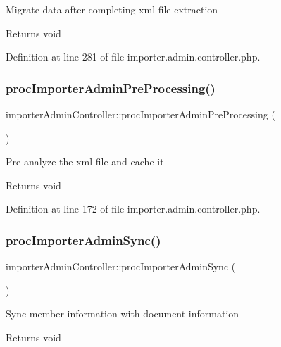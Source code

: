 Migrate data after completing xml file extraction \begin{DoxyReturn}{Returns}
void 
\end{DoxyReturn}


Definition at line 281 of file importer.\+admin.\+controller.\+php.

\hypertarget{classimporterAdminController_a112303ff9925d381a27f526b97909205}{}\label{classimporterAdminController_a112303ff9925d381a27f526b97909205} 
\subsubsection{\texorpdfstring{proc\+Importer\+Admin\+Pre\+Processing()}{procImporterAdminPreProcessing()}}
{\footnotesize\ttfamily importer\+Admin\+Controller\+::proc\+Importer\+Admin\+Pre\+Processing (\begin{DoxyParamCaption}{ }\end{DoxyParamCaption})}

Pre-\/analyze the xml file and cache it \begin{DoxyReturn}{Returns}
void 
\end{DoxyReturn}


Definition at line 172 of file importer.\+admin.\+controller.\+php.

\hypertarget{classimporterAdminController_a979a756ae2a180270e08f72536c85d74}{}\label{classimporterAdminController_a979a756ae2a180270e08f72536c85d74} 
\subsubsection{\texorpdfstring{proc\+Importer\+Admin\+Sync()}{procImporterAdminSync()}}
{\footnotesize\ttfamily importer\+Admin\+Controller\+::proc\+Importer\+Admin\+Sync (\begin{DoxyParamCaption}{ }\end{DoxyParamCaption})}

Sync member information with document information \begin{DoxyReturn}{Returns}
void 
\end{DoxyReturn}


